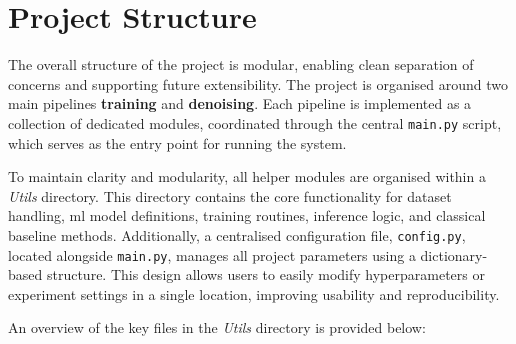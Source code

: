 \chapter{Project Structure}
\label{appendix:project_structure}

The overall structure of the project is modular, enabling clean separation of concerns and supporting future extensibility. The project is organised around two main pipelines \textbf{training} and \textbf{denoising}. Each pipeline is implemented as a collection of dedicated modules, coordinated through the central \texttt{main.py} script, which serves as the entry point for running the system.

To maintain clarity and modularity, all helper modules are organised within a \textit{Utils} directory. This directory contains the core functionality for dataset handling, \gls{ml} model definitions, training routines, inference logic, and classical baseline methods. Additionally, a centralised configuration file, \texttt{config.py}, located alongside \texttt{main.py}, manages all project parameters using a dictionary-based structure. This design allows users to easily modify hyperparameters or experiment settings in a single location, improving usability and reproducibility.

An overview of the key files in the \textit{Utils} directory is provided below:

